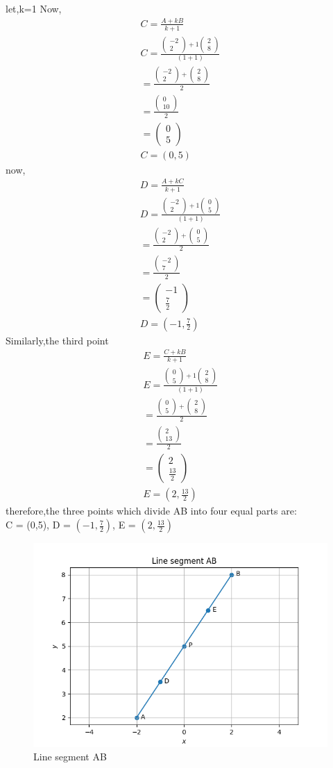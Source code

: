 \documentclass[10pt]{article}
\newcommand{\myvec}[1]{\ensuremath{\begin{pmatrix}#1\end{pmatrix}}}
\begin{document}
\begin{enumerate}
   let,k=1 
Now, 
\begin{align}
C = \frac{A+kB}{k+1}\\
C = \frac{\myvec{-2\\2}+1\myvec{2\\8}}{(1+1)}\\
= \frac{\myvec{-2\\2}+\myvec{2\\8}}{2}\\
= \frac{\myvec{0\\10}}{2}\\
 = \myvec{0\\5}\\
C = (0,5)
\end{align}	
now, 
\begin{align}
D = \frac{A+kC}{k+1}\\
D = \frac{\myvec{-2\\2}+1\myvec{0\\5}}{(1+1)}\\
= \frac{\myvec{-2\\2}+\myvec{0\\5}}{2}\\
= \frac{\myvec{-2\\7}}{2}\\
= \myvec{-1\\\frac{7}{2}}\\
D = (-1,\frac{7}{2})
\end{align}
Similarly,the third point 
\begin{align}
E = \frac{C+kB}{k+1}\\
E = \frac{\myvec{0\\5}+1\myvec{2\\8}}{(1+1)}\\
= \frac{\myvec{0\\5}+\myvec{2\\8}}{2}\\
= \frac{\myvec{2\\13}}{2}\\
 = \myvec{2\\\frac{13}{2}}\\
E = (2,\frac{13}{2})
\end{align}
therefore,the three points which divide AB into four equal parts are:\\
C = (0,5),
D = $(-1,\frac{7}{2})$,
E = $(2,\frac{13}{2})$
\end{enumerate}

\begin{figure}[H]
			\centering
			\includegraphics[width=\columnwidth]{figs/Figure_1.png}
			\caption{Line segment AB}
			\label{fig:3}
		\end{figure}
\end{document}
